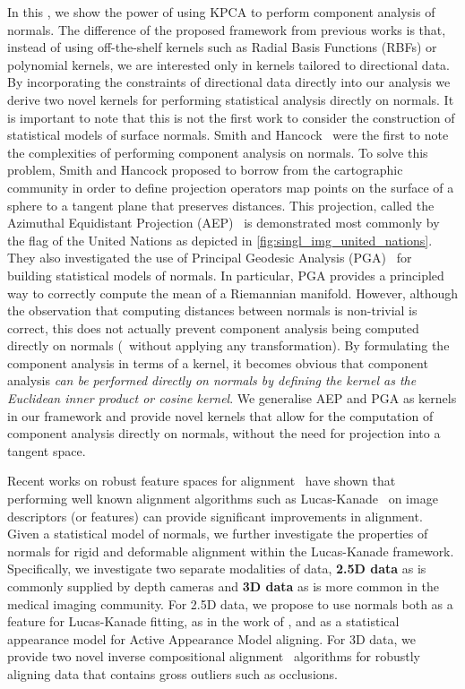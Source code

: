 In this , we show the power of using KPCA to perform
component analysis of normals. The difference of the proposed framework from
previous works is that, instead of using off-the-shelf kernels such as Radial
Basis Functions (RBFs) or polynomial kernels, we are interested only in kernels
tailored to directional data. By incorporating the constraints of directional
data directly into our analysis we derive two novel kernels for performing
statistical analysis directly on normals. It is important to note that this is
not the first work to consider the construction of statistical models of surface
normals. Smith and Hancock~\cite{smith2006recovering,smith2008facial} were the
first to note the complexities of performing component analysis on normals. To
solve this problem, Smith and Hancock proposed to borrow from the cartographic
community in order to define projection operators map points on the surface of a
sphere to a tangent plane that preserves distances. This projection, called the
Azimuthal Equidistant Projection (AEP)~\cite{snyder1987map} is demonstrated most
commonly by the flag of the United Nations as depicted in
\cref{fig:singl_img_united_nations}. They also investigated the use of Principal
Geodesic Analysis (PGA)~\cite{fletcher2004principal,smith2008facial} for
building statistical models of normals. In particular, PGA provides a principled
way to correctly compute the mean of a Riemannian manifold. However, although
the observation that computing distances between normals is non-trivial is
correct, this does not actually prevent component analysis being computed
directly on normals (\ie~without applying any transformation). By formulating
the component analysis in terms of a kernel, it becomes obvious that component
analysis \textit{can be performed directly on normals by defining the kernel as
the Euclidean inner product or cosine kernel}. We generalise AEP and PGA as
kernels in our framework and provide novel kernels that allow for the
computation of component analysis directly on normals, without the need for
projection into a tangent space.

Recent works on robust feature spaces for alignment~\cite{antonakos2015feature}
have shown that performing well known alignment algorithms such as
Lucas-Kanade~\cite{lucas1981iterative} on image descriptors (or features) can
provide significant improvements in alignment. Given a statistical model
of normals, we further investigate the properties of normals for rigid and
deformable alignment within the Lucas-Kanade framework. Specifically, we
investigate two separate modalities of data, \textbf{2.5D data} as is
commonly supplied by depth cameras and \textbf{3D data} as is more common
in the medical imaging community. For 2.5D data, we propose to use normals both
as a feature for Lucas-Kanade fitting, as in the work of
\citet{antonakos2015feature}, and as a statistical appearance model for Active
Appearance Model aligning. For 3D data, we provide two novel inverse
compositional alignment~\cite{baker2004lucas} algorithms for robustly aligning
data that contains gross outliers such as occlusions.

